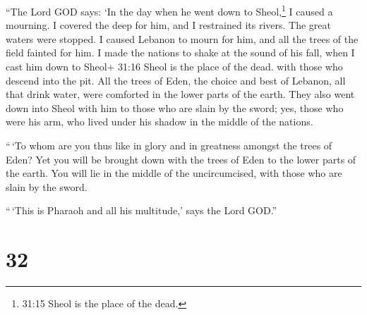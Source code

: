  ``The Lord GOD says: `In the day when he went down to
Sheol,\footnote{31:15 Sheol is the place of the dead.} I caused a
mourning. I covered the deep for him, and I restrained its rivers. The
great waters were stopped. I caused Lebanon to mourn for him, and all
the trees of the field fainted for him.  I made the nations
to shake at the sound of his fall, when I cast him down to Sheol+ 31:16
Sheol is the place of the dead. with those who descend into the pit. All
the trees of Eden, the choice and best of Lebanon, all that drink water,
were comforted in the lower parts of the earth.  They also
went down into Sheol with him to those who are slain by the sword; yes,
those who were his arm, who lived under his shadow in the middle of the
nations.

 ``\,`To whom are you thus like in glory and in greatness
amongst the trees of Eden? Yet you will be brought down with the trees
of Eden to the lower parts of the earth. You will lie in the middle of
the uncircumcised, with those who are slain by the sword.

``\,`This is Pharaoh and all his multitude,' says the Lord GOD.''

\hypertarget{section-30}{%
\section{32}\label{section-30}}

